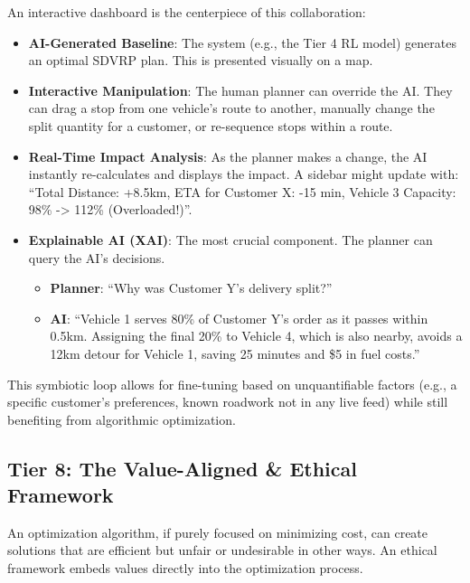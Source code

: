 \documentclass{article}
\begin{document}
An interactive dashboard is the centerpiece of this collaboration:
\begin{itemize}
    \item \textbf{AI-Generated Baseline}: The system (e.g., the Tier 4 RL model) generates an optimal SDVRP plan. This is presented visually on a map.
    \item \textbf{Interactive Manipulation}: The human planner can override the AI. They can drag a stop from one vehicle's route to another, manually change the split quantity for a customer, or re-sequence stops within a route.
    \item \textbf{Real-Time Impact Analysis}: As the planner makes a change, the AI instantly re-calculates and displays the impact. A sidebar might update with: ``Total Distance: +8.5km, ETA for Customer X: -15 min, Vehicle 3 Capacity: 98\% -> 112\% (Overloaded!)''.
    \item \textbf{Explainable AI (XAI)}: The most crucial component. The planner can query the AI's decisions.
        \begin{itemize}
            \item \textbf{Planner}: ``Why was Customer Y's delivery split?''
            \item \textbf{AI}: ``Vehicle 1 serves 80\% of Customer Y's order as it passes within 0.5km. Assigning the final 20\% to Vehicle 4, which is also nearby, avoids a 12km detour for Vehicle 1, saving 25 minutes and \$5 in fuel costs.''
        \end{itemize}
\end{itemize}
This symbiotic loop allows for fine-tuning based on unquantifiable factors (e.g., a specific customer's preferences, known roadwork not in any live feed) while still benefiting from algorithmic optimization.

\subsection{Tier 8: The Value-Aligned \& Ethical Framework}
An optimization algorithm, if purely focused on minimizing cost, can create solutions that are efficient but unfair or undesirable in other ways. An ethical framework embeds values directly into the optimization process.
\end{document}
